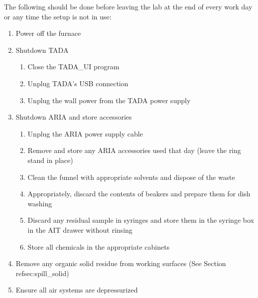The following should be done before leaving the lab at the end of every
work day or any time the setup is not in use:

\begin{enumerate}
\def\labelenumi{\arabic{enumi}.}
\tightlist
\item
  Power off the furnace
\item
  Shutdown TADA

  \begin{enumerate}
  \def\labelenumii{\arabic{enumii}.}
  \tightlist
  \item
    Close the TADA\_UI program
  \item
    Unplug TADA's USB connection
  \item
    Unplug the wall power from the TADA power supply
  \end{enumerate}
\item
  Shutdown ARIA and store accessories

  \begin{enumerate}
  \def\labelenumii{\arabic{enumii}.}
  \tightlist
  \item
    Unplug the ARIA power supply cable
  \item
    Remove and store any ARIA accessories used that day (leave the ring
    stand in place)
  \item
    Clean the funnel with appropriate solvents and dispose of the waste
  \item
    Appropriately, discard the contents of beakers and prepare them for
    dish washing
  \item
    Discard any residual sample in syringes and store them in the
    syringe box in the AIT drawer without rinsing
  \item
    Store all chemicals in the appropriate cabinets
  \end{enumerate}
\item
  Remove any organic solid residue from working surfaces (See Section
  refsec:spill\_solid)
\item
  Ensure all air systems are depressurized


\end{enumerate}
